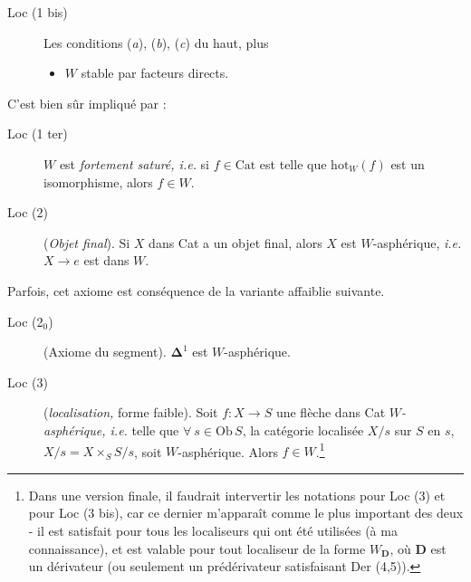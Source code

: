 \documentclass[11pt]{article}
\newcommand{\msp}[1]{\marginpar{\footnotesize [#1]}}
\newcommand{\Cat}{\mathrm{Cat}}
\newcommand{\Ob}{\mathrm{Ob}\,}
\newcommand{\hot}{\mathrm{hot}}
\begin{document}
\begin{description}
\item[Loc (1 bis)] Les conditions (\textit{a}), (\textit{b}), (\textit{c}) du haut, plus
\begin{itemize}
\item[\textit{d})] $W$ stable par facteurs directs.
\end{itemize}
\end{description}

C’est bien sûr impliqué par :

\begin{description}
\item[Loc (1 ter)] $W$ est \textit{fortement saturé, i.e.} si $f \in \Cat$ est telle que $\hot_W(f)$ est un isomorphisme, alors $f \in W$.
\item[Loc (2)] (\textit{Objet final}). Si $X$ dans Cat a un objet final, alors $X$ est $W$-asphérique, \textit{i.e.} $X \longrightarrow e$ est dans $W$.
\end{description}

Parfois, cet axiome est conséquence de la variante affaiblie suivante.

\begin{description}
\item[Loc (2$_0$)] (Axiome du segment). $\boldsymbol{\Delta}^1$ est $W$-asphérique.
\end{description}

\msp{page 2}

\begin{description}
\item[Loc (3)] (\textit{localisation,} forme faible). Soit $f : X \longrightarrow S$ une flèche dans Cat $W$\textit{-asphérique, i.e.} telle que $\forall\ s \in \Ob S$, la catégorie localisée $X/s$ sur $S$ en $s$, $X/s = X \times_S S/s$, soit $W$-asphérique. Alors $f \in W$.\footnote[1]{Dans une version finale, il faudrait intervertir les notations pour Loc (3) et pour Loc (3 bis), car ce dernier m’apparaît comme le plus important des deux - il est satisfait pour tous les localiseurs qui ont été utilisées (à ma connaissance), et est valable pour tout localiseur de la forme $W_{\mathbf{D}}$, où $\mathbf{D}$ est un dérivateur (ou seulement un prédérivateur satisfaisant Der (4,5)).} %
\end{description}
\end{document}
